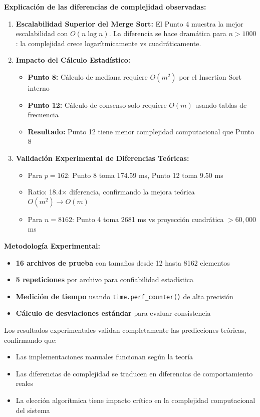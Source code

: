 \documentclass[11pt,a4paper]{article}
\begin{document}
\textbf{Explicación de las diferencias de complejidad observadas:}

\begin{enumerate}[label=\arabic*.]
\item \textbf{Escalabilidad Superior del Merge Sort:} El Punto 4 muestra la mejor escalabilidad con $O(n \log n)$. La diferencia se hace dramática para $n > 1000$: la complejidad crece logarítmicamente vs cuadráticamente.

\item \textbf{Impacto del Cálculo Estadístico:} 
   \begin{itemize}[label=\textbullet]
   \item \textbf{Punto 8:} Cálculo de mediana requiere $O(m^2)$ por el Insertion Sort interno
   \item \textbf{Punto 12:} Cálculo de consenso solo requiere $O(m)$ usando tablas de frecuencia
   \item \textbf{Resultado:} Punto 12 tiene menor complejidad computacional que Punto 8
   \end{itemize}

\item \textbf{Validación Experimental de Diferencias Teóricas:}
   \begin{itemize}[label=\textbullet]
   \item Para $p = 162$: Punto 8 toma 174.59 ms, Punto 12 toma 9.50 ms
   \item Ratio: 18.4× diferencia, confirmando la mejora teórica $O(m^2) \rightarrow O(m)$
   \item Para $n = 8162$: Punto 4 toma 2681 ms vs proyección cuadrática $> 60,000$ ms
   \end{itemize}
\end{enumerate}

\textbf{Metodología Experimental:}
\begin{itemize}[label=\textbullet]
\item \textbf{16 archivos de prueba} con tamaños desde 12 hasta 8162 elementos
\item \textbf{5 repeticiones} por archivo para confiabilidad estadística  
\item \textbf{Medición de tiempo} usando \texttt{time.perf\_counter()} de alta precisión
\item \textbf{Cálculo de desviaciones estándar} para evaluar consistencia
\end{itemize}

Los resultados experimentales validan completamente las predicciones teóricas, confirmando que:
\begin{itemize}[label=\checkmark]
\item Las implementaciones manuales funcionan según la teoría
\item Las diferencias de complejidad se traducen en diferencias de comportamiento reales
\item La elección algorítmica tiene impacto crítico en la complejidad computacional del sistema
\end{itemize}
\end{document}
